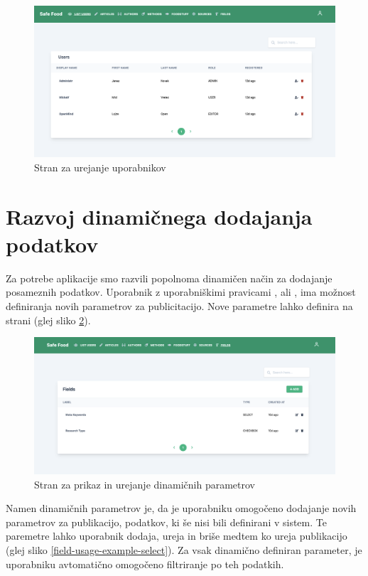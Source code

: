 \documentclass[a4paper, 12pt]{book}
\begin{document}
\begin{figure}[h]
\begin{center}
\includegraphics[width=1\textwidth]{slike/users-list.png}
\end{center}
\caption{ Stran za urejanje uporabnikov }
\label{users-list-page}
\end{figure}


\section{Razvoj dinamičnega dodajanja podatkov}
Za potrebe aplikacije smo razvili popolnoma dinamičen način za dodajanje posameznih podatkov. Uporabnik z uporabniškimi pravicami , ali , ima možnost definiranja novih parametrov za publicitacijo. Nove parametre lahko definira na strani  (glej sliko \ref{fields-list}). 

\begin{figure}[h]
\begin{center}
\includegraphics[width=1\textwidth]{slike/fields-list.png}
\end{center}
\caption{ Stran za prikaz in urejanje dinamičnih parametrov }
\label{fields-list}
\end{figure}

Namen dinamičnih parametrov je, da je uporabniku omogočeno dodajanje novih parametrov za publikacijo, podatkov, ki še nisi bili definirani v sistem. Te paremetre lahko uporabnik dodaja, ureja in briše medtem ko ureja publikacijo (glej sliko \ref{field-usage-example-select}). Za vsak dinamično definiran parameter, je uporabniku avtomatično omogočeno filtriranje po teh podatkih. 
\end{document}

